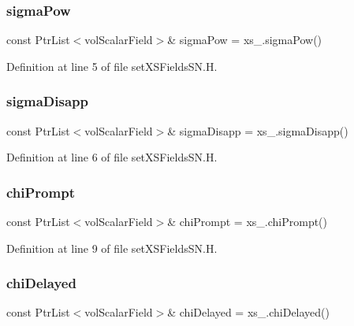 \subsubsection{\texorpdfstring{sigma\+Pow}{sigmaPow}}
{\footnotesize\ttfamily const Ptr\+List$<$vol\+Scalar\+Field$>$\& sigma\+Pow = xs\+\_\+.\+sigma\+Pow()}



Definition at line 5 of file set\+X\+S\+Fields\+S\+N.\+H.

\mbox{\label{setXSFieldsSN_8H_a26e2cc0a2f240dbf0b8888db0c8869e2}} 
\subsubsection{\texorpdfstring{sigma\+Disapp}{sigmaDisapp}}
{\footnotesize\ttfamily const Ptr\+List$<$vol\+Scalar\+Field$>$\& sigma\+Disapp = xs\+\_\+.\+sigma\+Disapp()}



Definition at line 6 of file set\+X\+S\+Fields\+S\+N.\+H.

\mbox{\label{setXSFieldsSN_8H_ae99cb941c26b8d02c30336ffe9d73cd2}} 
\subsubsection{\texorpdfstring{chi\+Prompt}{chiPrompt}}
{\footnotesize\ttfamily const Ptr\+List$<$vol\+Scalar\+Field$>$\& chi\+Prompt = xs\+\_\+.\+chi\+Prompt()}



Definition at line 9 of file set\+X\+S\+Fields\+S\+N.\+H.

\mbox{\label{setXSFieldsSN_8H_a40cc7f7cbcb1b9e71096e95b125537c2}} 
\subsubsection{\texorpdfstring{chi\+Delayed}{chiDelayed}}
{\footnotesize\ttfamily const Ptr\+List$<$vol\+Scalar\+Field$>$\& chi\+Delayed = xs\+\_\+.\+chi\+Delayed()}



